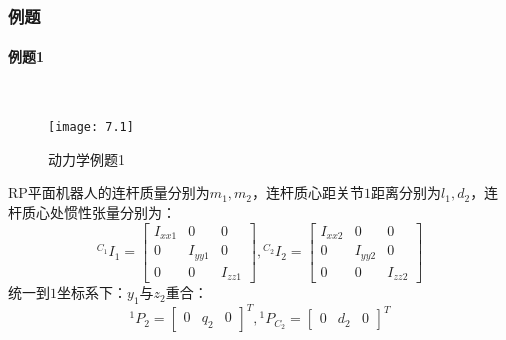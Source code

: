\documentclass[
12pt, %
a4paper, 
oneside, %
headinclude,footinclude, %
]{scrartcl}
\begin{document}
\subsubsection[例题]{例题}
{\footnotesize
\paragraph{例题1}~\\
\begin{minipage}{0.3\textwidth}
\begin{figure}[H]
\centering 
\texttt{[image: 7.1]} 
\caption{动力学例题1}
\end{figure}
\end{minipage}
\begin{minipage}{0.7\textwidth}
\hspace{2em}
RP平面机器人的连杆质量分别为$ m_1, m_2 $，连杆质心距关节$ 1 $距离分别为$ l_1, d_2 $，连杆质心处惯性张量分别为：
$$ {{}^{C_1}}I_1 = \begin{bmatrix} I_{xx1} & 0 & 0 \\ 0 & I_{yy1} & 0 \\ 0 & 0 & I_{zz1} \end{bmatrix}, {{}^{C_2}}I_2 = \begin{bmatrix} I_{xx2} & 0 & 0 \\ 0 & I_{yy2} & 0 \\ 0 & 0 & I_{zz2} \end{bmatrix} $$
\hspace{2em}
统一到$ 1 $坐标系下：$ y_1 $与$ z_2 $重合：
$$ {}^1 P_2 = \begin{bmatrix} 0 & q_2 & 0 \end{bmatrix}^T, {}^1 P_{C_2} = \begin{bmatrix} 0 & d_2 & 0 \end{bmatrix}^T $$
\end{minipage}
}
\end{document}
